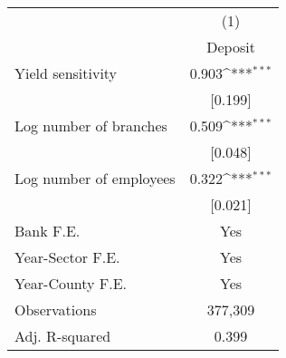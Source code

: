{
\def\sym#1{\ifmmode^{#1}\else\(^{#1}\)\fi}
\begin{tabular*}{\hsize}{@{\hskip\tabcolsep\extracolsep\fill}l*{1}{c}}
\hline\hline
                    &\multicolumn{1}{c}{(1)}\\
                    &\multicolumn{1}{c}{Deposit}\\
\hline
Yield sensitivity   &       0.903\sym{***}\\
                    &     [0.199]         \\
[1em]
Log number of branches&       0.509\sym{***}\\
                    &     [0.048]         \\
[1em]
Log number of employees&       0.322\sym{***}\\
                    &     [0.021]         \\
\hline
Bank F.E.           &         Yes         \\
Year-Sector F.E.    &         Yes         \\
Year-County F.E.    &         Yes         \\
Observations        &     377,309         \\
Adj. R-squared      &       0.399         \\
\hline\hline
\end{tabular*}
}
